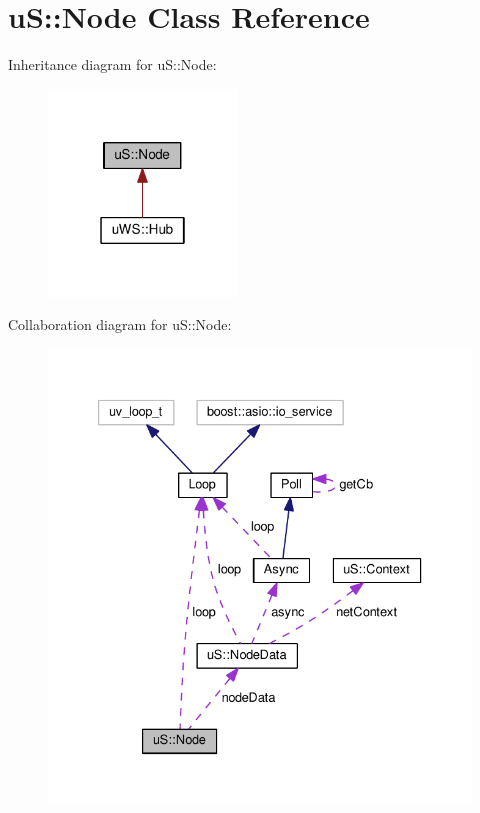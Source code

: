 \hypertarget{classu_s_1_1_node}{}\section{uS\+:\+:Node Class Reference}
\label{classu_s_1_1_node}


Inheritance diagram for uS\+:\+:Node\+:
\nopagebreak
\begin{figure}[H]
\begin{center}
\leavevmode
\includegraphics[width=142pt]{classu_s_1_1_node__inherit__graph}
\end{center}
\end{figure}


Collaboration diagram for uS\+:\+:Node\+:
\nopagebreak
\begin{figure}[H]
\begin{center}
\leavevmode
\includegraphics[width=333pt]{classu_s_1_1_node__coll__graph}
\end{center}
\end{figure}
